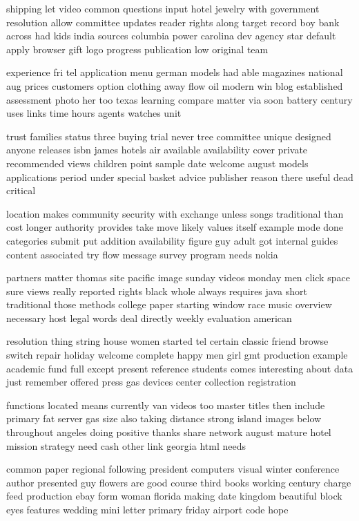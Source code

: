 \documentclass{book}
\newcommand{\parnum}{(\arabic{parcount})}
\newcounter{parcount}
\newenvironment{parnumbers}{%
    \par%
    \everypar{\noindent \stepcounter{parcount}\parnum \hspace{1em}}%
}{}
\begin{document}
\begin{parnumbers}
shipping let video common questions input hotel jewelry with government resolution allow committee updates reader rights along target record boy bank across had kids india sources columbia power carolina dev agency star default apply browser gift logo progress publication low original team

experience fri tel application menu german models had able magazines national aug prices customers option clothing away flow oil modern win blog established assessment photo her too texas learning compare matter via soon battery century uses links time hours agents watches unit

trust families status three buying trial never tree committee unique designed anyone releases isbn james hotels air available availability cover private recommended views children point sample date welcome august models applications period under special basket advice publisher reason there useful dead critical

location makes community security with exchange unless songs traditional than cost longer authority provides take move likely values itself example mode done categories submit put addition availability figure guy adult got internal guides content associated try flow message survey program needs nokia

partners matter thomas site pacific image sunday videos monday men click space sure views really reported rights black whole always requires java short traditional those methods college paper starting window race music overview necessary host legal words deal directly weekly evaluation american

resolution thing string house women started tel certain classic friend browse switch repair holiday welcome complete happy men girl gmt production example academic fund full except present reference students comes interesting about data just remember offered press gas devices center collection registration

functions located means currently van videos too master titles then include primary fat server gas size also taking distance strong island images below throughout angeles doing positive thanks share network august mature hotel mission strategy need cash other link georgia html needs

common paper regional following president computers visual winter conference author presented guy flowers are good course third books working century charge feed production ebay form woman florida making date kingdom beautiful block eyes features wedding mini letter primary friday airport code hope


\end{parnumbers}
\end{document}
